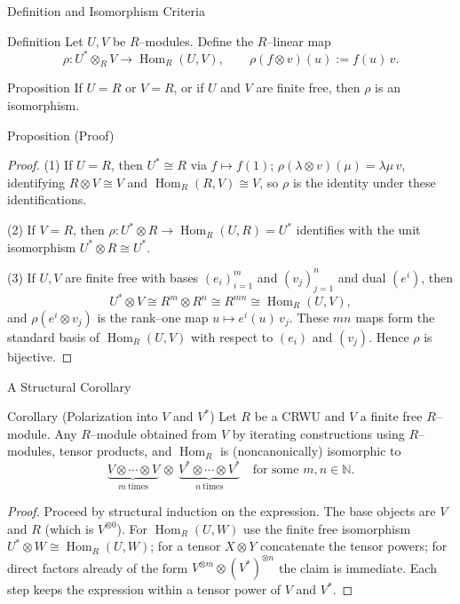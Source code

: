 \begin{frame}{Definition and Isomorphism Criteria}
\begin{block}{Definition}
Let $U,V$ be $R$–modules. Define the $R$–linear map
\[
\rho: U^*\otimes_R V \longrightarrow \operatorname{Hom}_R(U,V),\qquad
\rho(f\otimes v)(u):= f(u)\,v.
\]
\end{block}

\begin{block}{Proposition}
If $U=R$ or $V=R$, or if $U$ and $V$ are finite free, then $\rho$ is an isomorphism.
\end{block}
\end{frame}

\begin{frame}{Proposition (Proof)}

\begin{proof}
(1) If $U=R$, then $U^*\cong R$ via $f\mapsto f(1)$; $\rho(\lambda\otimes v)(\mu)=\lambda\mu\, v$, identifying $R\otimes V\cong V$ and $\operatorname{Hom}_R(R,V)\cong V$, so $\rho$ is the identity under these identifications.

(2) If $V=R$, then $\rho:U^*\otimes R\to \operatorname{Hom}_R(U,R)=U^*$ identifies with the unit isomorphism $U^*\otimes R\cong U^*$.

(3) If $U,V$ are finite free with bases $(e_i)_{i=1}^m$ and $(v_j)_{j=1}^n$ and dual $(e^i)$, then
\[
U^*\otimes V \cong R^{m}\otimes R^{n}\cong R^{mn}\cong \operatorname{Hom}_R(U,V),
\]
and $\rho(e^i\otimes v_j)$ is the rank–one map $u\mapsto e^i(u)\,v_j$. These $mn$ maps form the standard basis of $\operatorname{Hom}_R(U,V)$ with respect to $(e_i)$ and $(v_j)$. Hence $\rho$ is bijective.
\end{proof}
\end{frame}

\begin{frame}{A Structural Corollary}
\vspace{-0.3cm}
\begin{block}{Corollary (Polarization into $V$ and $V^*$)}
Let $R$ be a CRWU and $V$ a finite free $R$–module. Any $R$–module obtained from $V$ by iterating constructions using $R$–modules, tensor products, and $\operatorname{Hom}_R$ is (noncanonically) isomorphic to
\[
\underbrace{V\otimes\cdots\otimes V}_{m\ \text{times}}\ \otimes\
\underbrace{V^*\otimes\cdots\otimes V^*}_{n\ \text{times}}
\quad\text{for some }m,n\in\mathbb{N}.
\]
\end{block}
\vspace{-0.3cm}
\begin{proof}
Proceed by structural induction on the expression. The base objects are $V$ and $R$ (which is $V^{\otimes 0}$).
For $\operatorname{Hom}_R(U,W)$ use the finite free isomorphism $U^*\otimes W \cong \operatorname{Hom}_R(U,W)$; for a tensor $X\otimes Y$ concatenate the tensor powers; for direct factors already of the form $V^{\otimes m}\otimes (V^*)^{\otimes n}$ the claim is immediate. Each step keeps the expression within a tensor power of $V$ and $V^*$.
\end{proof}
\end{frame}

